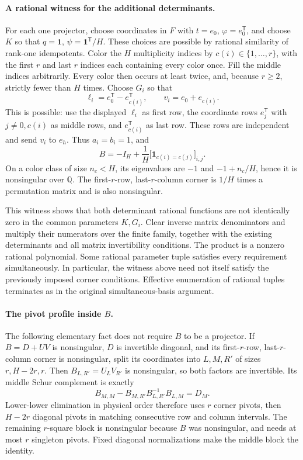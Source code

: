 \paragraph{A rational witness for the additional determinants.}
For each one projector, choose coordinates in \(F\) with
\(t=e_0\), \(\varphi=e_0^{\mathsf T}\), and choose \(K\) so that
\(q=\mathbf1\), \(\psi=\mathbf1^{\mathsf T}/H\).
These choices are possible by rational similarity of rank-one idempotents.
Color the \(H\) multiplicity indices by \(c(i)\in\{1,\ldots,r\}\),
with the first \(r\) and last \(r\) indices each containing every color
once. Fill the middle indices arbitrarily. Every color then occurs at
least twice, and, because \(r\ge2\), strictly fewer than \(H\) times.
Choose \(G_i\) so that
\[
 \ell_i=e_0^{\mathsf T}-e_{c(i)}^{\mathsf T},\qquad
 v_i=e_0+e_{c(i)}.
\]
This is possible: use the displayed \(\ell_i\) as first row, the
coordinate rows \(e_j^{\mathsf T}\) with \(j\ne0,c(i)\) as middle
rows, and \(e_{c(i)}^{\mathsf T}\) as last row. These rows are independent
and send \(v_i\) to \(e_h\). Thus \(a_i=b_i=1\), and
\[
 B=-I_H+\frac1H\bigl[\mathbf1_{c(i)=c(j)}\bigr]_{i,j}.
\]
On a color class of size \(n_c<H\), its eigenvalues are \(-1\) and
\(-1+n_c/H\), hence it is nonsingular over \(\mathbb Q\).
The first-\(r\)-row, last-\(r\)-column corner is \(1/H\) times a
permutation matrix and is also nonsingular.

This witness shows that both determinant rational functions are not
identically zero in the common parameters \(K,G_i\). Clear inverse
matrix denominators and multiply their numerators over the finite family,
together with the existing determinants and all matrix invertibility
conditions. The product is a nonzero rational polynomial. Some rational
parameter tuple satisfies every requirement simultaneously. In particular,
the witness above need not itself satisfy the previously imposed corner
conditions. Effective enumeration of rational tuples terminates as in the
original simultaneous-basis argument.

\paragraph{The pivot profile inside \(B\).}
The following elementary fact does not require \(B\) to be a projector.
If \(B=D+UV\) is nonsingular, \(D\) is invertible diagonal, and its
first-\(r\)-row, last-\(r\)-column corner is nonsingular, split its
coordinates into \(L,M,R'\) of sizes \(r,H-2r,r\).
Then \(B_{L,R'}=U_LV_{R'}\) is nonsingular, so both factors are
invertible. Its middle Schur complement is exactly
\[
 B_{M,M}-B_{M,R'}B_{L,R'}^{-1}B_{L,M}=D_M.
\]
Lower-lower elimination in physical order therefore uses \(r\) corner
pivots, then \(H-2r\) diagonal pivots in matching consecutive row and
column intervals. The remaining \(r\)-square block is nonsingular
because \(B\) was nonsingular, and needs at most \(r\) singleton pivots.
Fixed diagonal normalizations make the middle block the identity.

